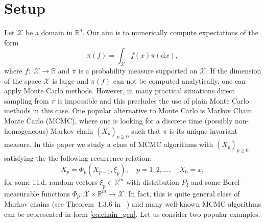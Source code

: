 \documentclass[bj]{imsart}
\def\rmd{\mathrm{d}}
\begin{document}
\section{Setup}\label{sec:setup}
Let  \(\mathcal{X}\) be a domain in \( \mathbb{R}^d.\)  Our aim is to numerically compute  expectations of the form
\[
\pi(f)=\int_{\mathcal{X}} f(x)\pi(\rmd x),
\]
where \(f:\) \(\mathcal{X}\longrightarrow \mathbb{R}\) and \(\pi\) is a probability measure supported on \(\mathcal{X}.\)
If  the dimension of the space \(\mathcal{X}\) is large and \(\pi(f)\) can not be computed analytically, one can apply Monte Carlo methods. However, in many practical situations  direct sampling from \(\pi\) is impossible and this precludes the use of plain Monte Carlo methods in this case. One popular alternative to Monte Carlo  is Markov Chain Monte Carlo (MCMC), where one is looking for a discrete time  (possibly non-homogeneous) Markov chain   \((X_p)_{p\geq 0}\) such that \(\pi\) is its unique invariant measure. In this paper we study a class of MCMC algorithms with \((X_p)_{p\geq 0}\) satisfying the  the following recurrence relation:
\begin{equation}
\label{eq:chain_gen}
X_{p}=\Phi_{p}(X_{p-1},\xi_{p}),\quad p=1,2,\ldots ,\quad X_{0}=x,
\end{equation}
for some i.i.d.  random vectors \(\xi_p\in \mathbb{R}^m\) with distribution \(P_{\xi}\)
and some Borel-measurable
functions $\Phi_{p}\colon\mathcal{X}\times\mathbb{R}^{m}\to\mathcal{X}.$
In fact, this is quite general class of Markov chains (see Theorem~1.3.6 in ~\cite{moulines2018})
and many well-known MCMC algorithms can be represented in form \eqref{eq:chain_gen}.
Let us consider two popular examples.
\end{document}
